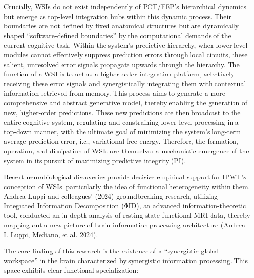 \documentclass[
  a4paper]{article}
\begin{document}
\begin{enumerate}
  Crucially, WSIs do not exist independently of PCT/FEP's hierarchical
  dynamics but emerge as top-level integration hubs within this dynamic
  process. Their boundaries are not defined by fixed anatomical
  structures but are dynamically shaped ``software-defined boundaries''
  by the computational demands of the current cognitive task. Within the
  system's predictive hierarchy, when lower-level modules cannot
  effectively suppress prediction errors through local circuits, these
  salient, unresolved error signals propagate upwards through the
  hierarchy. The function of a WSI is to act as a higher-order
  integration platform, selectively receiving these error signals and
  synergistically integrating them with contextual information retrieved
  from memory. This process aims to generate a more comprehensive and
  abstract generative model, thereby enabling the generation of new,
  higher-order predictions. These new predictions are then broadcast to
  the entire cognitive system, regulating and constraining lower-level
  processing in a top-down manner, with the ultimate goal of minimizing
  the system's long-term average prediction error, i.e., variational
  free energy. Therefore, the formation, operation, and dissipation of
  WSIs are themselves a mechanistic emergence of the system in its
  pursuit of maximizing predictive integrity (PI).

  Recent neurobiological discoveries provide decisive empirical support
  for IPWT's conception of WSIs, particularly the idea of functional
  heterogeneity within them. Andrea Luppi and colleagues' (2024)
  groundbreaking research, utilizing Integrated Information
  Decomposition (ΦID), an advanced information-theoretic tool, conducted
  an in-depth analysis of resting-state functional MRI data, thereby
  mapping out a new picture of brain information processing architecture
  (Andrea I. Luppi, Mediano, et al. 2024).

  The core finding of this research is the existence of a ``synergistic
  global workspace'' in the brain characterized by synergistic
  information processing. This space exhibits clear functional
  specialization:


\end{enumerate}
\end{document}

